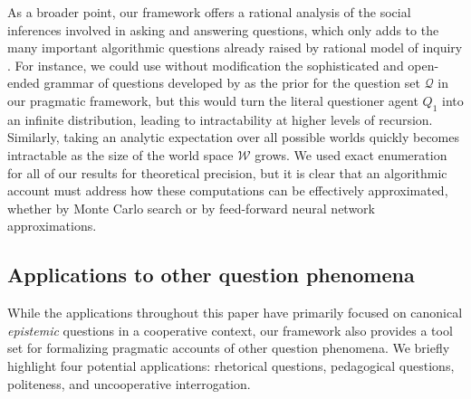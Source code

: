 \documentclass[11pt, floatsintext]{apa6}
\begin{document}
As a broader point, our framework offers a rational analysis of the social inferences involved in asking and answering questions, which only adds to the many important algorithmic questions already raised by rational model of inquiry .
For instance, we could use without modification the sophisticated and open-ended grammar of questions developed by  as the prior for the question set $\mathcal{Q}$ in our pragmatic framework, but this would turn the literal questioner agent $Q_1$ into an infinite distribution, leading to intractability at higher levels of recursion.
Similarly, taking an analytic expectation over all possible worlds quickly becomes intractable as the size of the world space $\mathcal{W}$ grows.
We used exact enumeration for all of our results for theoretical precision, but it is clear that an algorithmic account must address how these computations can be effectively approximated, whether by Monte Carlo search or by feed-forward neural network approximations.



\subsection{Applications to other question phenomena}

While the applications throughout this paper have primarily focused on canonical \emph{epistemic} questions in a cooperative context, our framework also provides a tool set for formalizing pragmatic accounts of other question phenomena. 
We briefly highlight four potential applications: rhetorical questions, pedagogical questions, politeness, and uncooperative interrogation.
\end{document}
